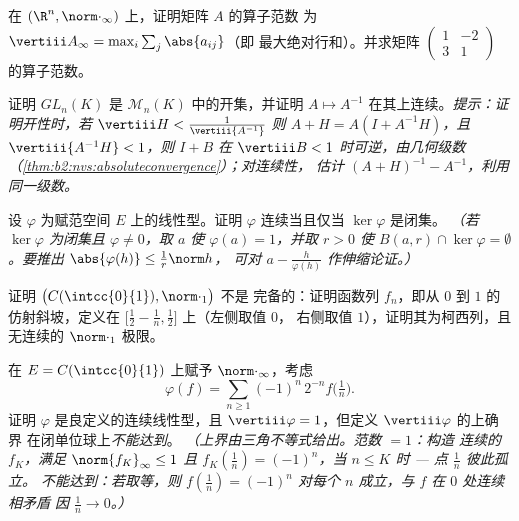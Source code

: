 \begin{exercise}[$\star\star$]\label{exo:b2:nvs:4}
在 $(\R^n, \norm\cdot_\infty)$ 上，证明矩阵 $A$ 的算子范数
为 $\vertiii A_\infty = \max_i \sum_j \abs{a_{ij}}$（即
最大绝对行和）。并求矩阵 $\begin{pmatrix} 1 & -2\\
3 & 1\end{pmatrix}$ 的算子范数。
\end{exercise}

\begin{exercise}[$\star\star$]\label{exo:b2:nvs:5}
证明 $GL_n(K)$ 是 $\mathcal{M}_n(K)$ 中的开集，并证明 $A
\mapsto A^{-1}$ 在其上连续。\emph{提示：证明开性时，若
$\vertiii H < \frac{1}{\vertiii{A^{-1}}}$ 则 $A + H = A(I +
A^{-1}H)$，且 $\vertiii{A^{-1}H} < 1$，则 $I + B$ 在
$\vertiii B < 1$ 时可逆，由几何级数
（\cref{thm:b2:nvs:absoluteconvergence}）；对连续性，
估计 $(A+H)^{-1} - A^{-1}$，利用同一级数。}
\end{exercise}

\begin{exercise}[$\star\star$]\label{exo:b2:nvs:6}
设 $\varphi$ 为赋范空间 $E$ 上的线性型。证明
$\varphi$ 连续当且仅当 $\ker\varphi$ 是闭集。
\emph{（若 $\ker\varphi$ 为闭集且 $\varphi \neq 0$，取 $a$
使 $\varphi(a) = 1$，并取 $r > 0$ 使 $B(a, r) \cap \ker\varphi =
\emptyset$。要推出 $\abs{\varphi(h)} \leq \frac{1}{r}\norm h$，
可对 $a - \frac{h}{\varphi(h)}$ 作伸缩论证。）}
\end{exercise}

\begin{exercise}[$\star\star$]\label{exo:b2:nvs:7}
证明 $\bigl(C(\intcc{0}{1}), \norm\cdot_1\bigr)$ 不是
完备的：证明函数列 $f_n$，即从 $0$ 到
$1$ 的仿射斜坡，定义在 $\bigl[\frac12 - \frac1n, \frac12\bigr]$ 上（左侧取值 $0$，
右侧取值 $1$），证明其为柯西列，且无连续的
$\norm\cdot_1$ 极限。
\end{exercise}

\begin{exercise}[$\star\star\star$]\label{exo:b2:nvs:8}
在 $E = C(\intcc{0}{1})$ 上赋予 $\norm\cdot_\infty$，考虑
\[
\varphi(f) = \sum_{n \geq 1} (-1)^n\, 2^{-n} f\bigl(\tfrac1n\bigr).
\]
证明 $\varphi$ 是良定义的连续线性型，且
$\vertiii\varphi = 1$，但定义 $\vertiii\varphi$ 的上确界
在闭单位球上\emph{不能达到}。
\emph{（上界由三角不等式给出。范数 $= 1$：构造
连续的 $f_K$，满足 $\norm{f_K}_\infty \leq 1$ 且 $f_K(\frac1n)
= (-1)^n$，当 $n \leq K$ 时 --- 点 $\frac1n$ 彼此孤立。
不能达到：若取等，则 $f(\frac1n) =
(-1)^n$ 对每个 $n$ 成立，与 $f$ 在 $0$ 处连续相矛盾
因 $\frac1n \to 0$。）}
\end{exercise}

